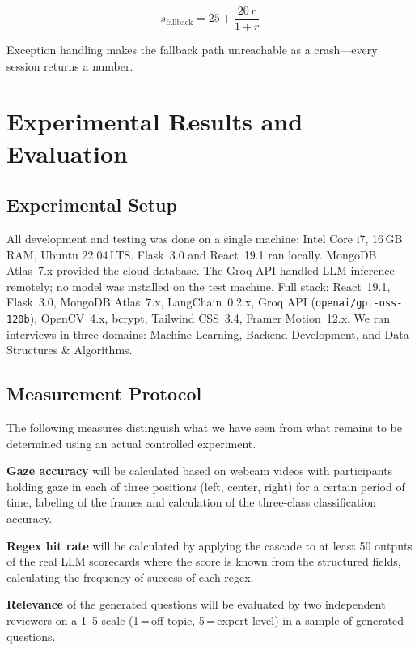 \documentclass[conference]{IEEEtran}
\begin{document}
\begin{equation}
  s_{\text{fallback}} = 25 + \frac{20\,r}{1 + r}
  \label{eq:fallback}
\end{equation}

Exception handling makes the fallback path unreachable as a
crash---every session returns a number.

\section{Experimental Results and Evaluation}
\label{sec:experiments}

\subsection{Experimental Setup}
All development and testing was done on a single machine: Intel Core i7,
16\,GB RAM, Ubuntu 22.04\,LTS. Flask~3.0 and React~19.1 ran locally.
MongoDB Atlas~7.x provided the cloud database. The Groq API handled LLM
inference remotely; no model was installed on the test machine. Full
stack: React~19.1, Flask~3.0, MongoDB Atlas~7.x, LangChain~0.2.x,
Groq API (\texttt{openai/gpt-oss-120b}), OpenCV~4.x, bcrypt,
Tailwind CSS~3.4, Framer Motion~12.x. We ran interviews in three
domains: Machine Learning, Backend Development, and Data Structures
\& Algorithms.

\subsection{Measurement Protocol}
\label{sec:protocol}
The following measures distinguish what we have seen from what remains to
be determined using an actual controlled experiment.

\textbf{Gaze accuracy} will be calculated based on webcam videos with
participants holding gaze in each of three positions (left, center,
right) for a certain period of time, labeling of the frames and
calculation of the three-class classification accuracy.

\textbf{Regex hit rate} will be calculated by applying the cascade to
at least 50 outputs of the real LLM scorecards where the score is known
from the structured fields, calculating the frequency of success of each
regex.

\textbf{Relevance} of the generated questions will be evaluated by two
independent reviewers on a 1--5 scale (1\,=\,off-topic,
5\,=\,expert level) in a sample of generated questions.
\end{document}
